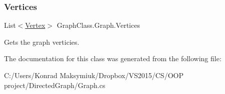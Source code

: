 \subsubsection{\texorpdfstring{Vertices}{Vertices}}
{\footnotesize\ttfamily List$<$\hyperlink{class_graph_class_1_1_vertex}{Vertex}$>$ Graph\+Class.\+Graph.\+Vertices\hspace{0.3cm}{\ttfamily [get]}}



Gets the graph verticies. 



The documentation for this class was generated from the following file\+:\begin{DoxyCompactItemize}
\item 
C\+:/\+Users/\+Konrad Maksymiuk/\+Dropbox/\+V\+S2015/\+C\+S/\+O\+O\+P project/\+Directed\+Graph/Graph.\+cs\end{DoxyCompactItemize}
